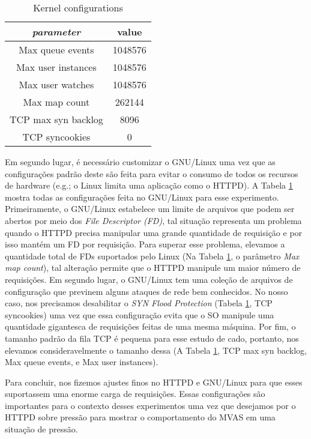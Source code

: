 \begin{table}
  \centering
  \begin{tabular}{|c|c|}
    \hline
    \textit{parameter} & \textbf{value}\\
    \hline
    Max queue events & 1048576\\
    \hline
    Max user instances & 1048576\\
    \hline
    Max user watches & 1048576\\
    \hline
    Max map count & 262144\\
    \hline
    TCP max syn backlog & 8096\\
    \hline
    TCP syncookies & 0\\
    \hline
  \end{tabular}
  \caption{Kernel configurations}
  \label{tab:kernel_config}
\end{table}

Em segundo lugar, é necessário customizar o GNU/Linux uma vez que as
configurações padrão deste são feita para evitar o consumo de todos os recursos
de hardware (e.g.; o Linux limita uma aplicação como o HTTPD). A Tabela
\ref{tab:kernel_config} mostra todas as configurações feita no GNU/Linux para
esse experimento. Primeiramente, o GNU/Linux estabelece um limite de arquivos
que podem ser abertos por meio dos \emph{File Descriptor (FD)}, tal situação
representa um problema quando o HTTPD precisa manipular uma grande quantidade
de requisição e por isso mantém um FD por requisição. Para superar esse
problema, elevamos a quantidade total de FDs suportados pelo Linux (Na Tabela
\ref{tab:kernel_config}, o parâmetro \emph{Max map count}), tal alteração
permite que o HTTPD manipule um maior número de requisições. Em segundo lugar,
o GNU/Linux tem uma coleção de arquivos de configuração que previnem alguns
ataques de rede bem conhecidos. No nosso caso, nos precisamos desabilitar o
\emph{SYN Flood Protection} (Tabela \ref{tab:kernel_config}, TCP syncookies)
uma vez que essa configuração evita que o SO manipule uma quantidade gigantesca
de requisições feitas de uma mesma máquina. Por fim, o tamanho padrão da fila
TCP é pequena para esse estudo de cado, portanto, nos elevamos
consideravelmente o tamanho dessa (A Tabela \ref{tab:kernel_config}, TCP max
syn backlog, Max queue events, e Max user instances).

Para concluir, nos fizemos ajustes finos no HTTPD e GNU/Linux para que esses
suportassem uma enorme carga de requisições. Essas configurações são
importantes para o contexto desses experimentos uma vez que desejamos por o
HTTPD sobre pressão para mostrar o comportamento do MVAS em uma situação de
pressão.

